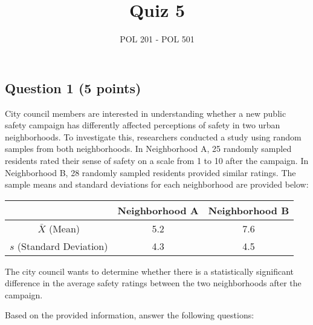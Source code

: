 \documentclass{article}
\title{Quiz 5}
\author{POL 201 - POL 501}
\date{}
\begin{document}
\maketitle

\subsection*{Question 1 (5 points)}
City council members are interested in understanding whether a new public safety campaign has differently affected perceptions of safety in two urban neighborhoods. To investigate this, researchers conducted a study using random samples from both neighborhoods. In Neighborhood A, 25 randomly sampled residents rated their sense of safety on a scale from 1 to 10 after the campaign. In Neighborhood B, 28 randomly sampled residents provided similar ratings. The sample means and standard deviations for each neighborhood are provided below:

\begin{center}
\renewcommand{\arraystretch}{1.5} %
\begin{tabular}{c|c|c}
\hline
     & \textbf{Neighborhood A} & \textbf{Neighborhood B} \\ \hline
  $\bar{X}$ (Mean) &  5.2 & 7.6 \\ \hline
  $s$ (Standard Deviation) &  4.3 &  4.5 \\ \hline
\end{tabular}
\end{center}


The city council wants to determine whether there is a statistically significant difference in the average safety ratings between the two neighborhoods after the campaign.

Based on the provided information, answer the following questions:
\end{document}
